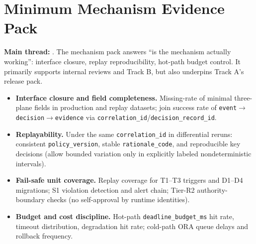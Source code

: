 \documentclass[11pt,a4paper]{report}
\begin{document}
\section{Minimum Mechanism Evidence Pack}
\textbf{Main thread:} \EvalFramework{}. The mechanism pack answers “is the mechanism actually working”: interface closure, replay reproducibility, hot-path budget control. It primarily supports internal reviews and Track B, but also underpins Track A’s release pack.
\begin{itemize}
  \item \textbf{Interface closure and field completeness.} Missing-rate of minimal three-plane fields in production and replay datasets; join success rate of \texttt{event}$\rightarrow$\texttt{decision}$\rightarrow$\texttt{evidence} via \texttt{correlation\_id}/\texttt{decision\_record\_id}.
  \item \textbf{Replayability.} Under the same \texttt{correlation\_id} in differential reruns: consistent \texttt{policy\_version}, stable \texttt{rationale\_code}, and reproducible key decisions (allow bounded variation only in explicitly labeled nondeterministic intervals).
  \item \textbf{Fail-safe unit coverage.} Replay coverage for T1--T3 triggers and D1--D4 migrations; S1 violation detection and alert chain; Tier-R2 authority-boundary checks (no self-approval by runtime identities).
  \item \textbf{Budget and cost discipline.} Hot-path \texttt{deadline\_budget\_ms} hit rate, timeout distribution, degradation hit rate; cold-path ORA queue delays and rollback frequency.
\end{itemize}
\end{document}
